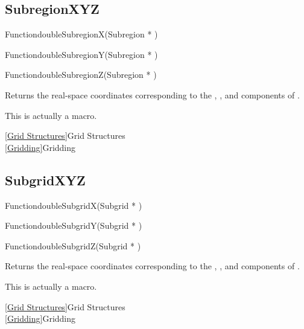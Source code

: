 
\newpage
\subsection{SubregionXYZ}
\label{SubregionXYZ}


\begin{deftypefn}{Function}{double}{SubregionX}({Subregion *} )
\end{deftypefn}
\begin{deftypefn}{Function}{double}{SubregionY}({Subregion *} )
\end{deftypefn}
\begin{deftypefn}{Function}{double}{SubregionZ}({Subregion *} )

\DESCRIPTION
Returns the real-space coordinates corresponding to the
, , and  components of .

\NOTES
This is actually a macro.

\SEEALSO
\vref{Grid Structures}{Grid Structures}\\
\vref{Gridding}{Gridding}

\end{deftypefn}


\newpage
\subsection{SubgridXYZ}
\label{SubgridXYZ}


\begin{deftypefn}{Function}{double}{SubgridX}({Subgrid *} )
\end{deftypefn}
\begin{deftypefn}{Function}{double}{SubgridY}({Subgrid *} )
\end{deftypefn}
\begin{deftypefn}{Function}{double}{SubgridZ}({Subgrid *} )

\DESCRIPTION
Returns the real-space coordinates corresponding to the
, , and  components of .

\NOTES
This is actually a macro.

\SEEALSO
\vref{Grid Structures}{Grid Structures}\\
\vref{Gridding}{Gridding}

\end{deftypefn}

